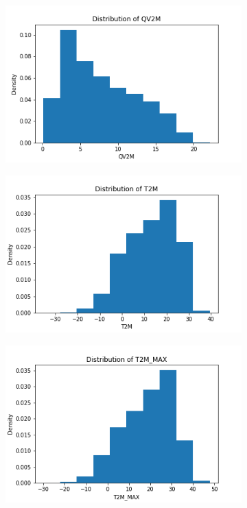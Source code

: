 \documentclass{article}
\begin{document}
\begin{itemize}
\begin{figure}[htbp]
\begin{subfigure}{0.3\textwidth}
                \includegraphics[width=\linewidth]{pic/hist/Distribution QV2M .png}
            \end{subfigure}
            \begin{subfigure}{0.3\textwidth}
                \centering
                \includegraphics[width=\linewidth]{pic/hist/Distribution T2M .png}
            \end{subfigure}
            \begin{subfigure}{0.3\textwidth}
                \centering
                \includegraphics[width=\linewidth]{pic/hist/Distribution T2M_MAX .png}

\end{subfigure}
\end{figure}
\end{itemize}
\end{document}
